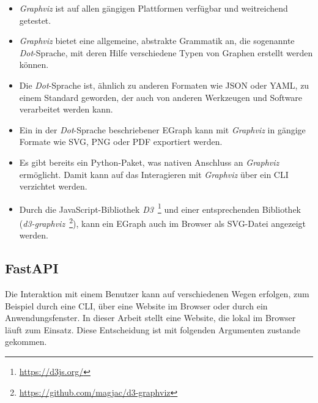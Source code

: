 \begin{itemize}
    \item \textit{Graphviz} ist auf allen gängigen Plattformen verfügbar und weitreichend getestet.
    \item \textit{Graphviz} bietet eine allgemeine, abstrakte Grammatik an, die sogenannte \textit{Dot}-Sprache, mit deren Hilfe verschiedene Typen von Graphen erstellt werden können.
    \item Die \textit{Dot}-Sprache ist, ähnlich zu anderen Formaten wie JSON oder YAML, zu einem Standard geworden, der auch von anderen Werkzeugen und Software verarbeitet werden kann.
    \item Ein in der \textit{Dot}-Sprache beschriebener EGraph kann mit \textit{Graphviz} in gängige Formate wie SVG, PNG oder PDF exportiert werden.
    \item Es gibt bereits ein Python-Paket, was nativen Anschluss an \textit{Graphviz} ermöglicht. Damit kann auf das Interagieren mit \textit{Graphviz} über ein CLI verzichtet werden.
    \item Durch die JavaScript-Bibliothek \textit{D3}~\footnote{\hspace{1.5mm}\url{https://d3js.org/}} und einer entsprechenden Bibliothek (\textit{d3-graphviz}~\footnote{\hspace{1.5mm}\url{https://github.com/magjac/d3-graphviz}}), kann ein EGraph auch im Browser als SVG-Datei angezeigt werden.
\end{itemize}

\subsection{FastAPI}

Die Interaktion mit einem Benutzer kann auf verschiedenen Wegen erfolgen, zum Beispiel durch eine CLI, über eine Website im Browser oder durch ein Anwendungsfenster.
In dieser Arbeit stellt eine Website, die lokal im Browser läuft zum Einsatz. Diese Entscheidung ist mit folgenden Argumenten zustande gekommen. 

